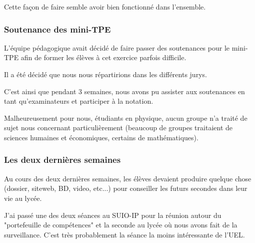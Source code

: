 Cette façon de faire semble avoir bien fonctionné dans l'ensemble.

\subsubsection{Soutenance des mini-TPE}

L'équipe pédagogique avait décidé de faire passer des soutenances pour le mini-TPE afin de former les élèves à cet
exercice parfois difficile.

Il a été décidé que nous nous répartirions dans les différents jurys.

C'est ainsi que pendant 3 semaines, nous avons pu assister aux soutenances en tant qu'examinateurs et participer à la
notation.

Malheureusement pour nous, étudiants en physique, aucun groupe n'a traité de sujet nous concernant particulièrement
(beaucoup de groupes traitaient de sciences humaines et économiques, certains de mathématiques).

\subsubsection{Les deux dernières semaines}

Au cours des deux dernières semaines, les élèves devaient produire quelque chose (dossier, siteweb, BD, video, etc...)
pour conseiller les futurs secondes dans leur vie au lycée.

J'ai passé une des deux séances au SUIO-IP pour la réunion autour du "portefeuille de compétences" et la seconde au
lycée où nous avons fait de la surveillance. C'est très probablement la séance la moins intéressante de l'UEL.

